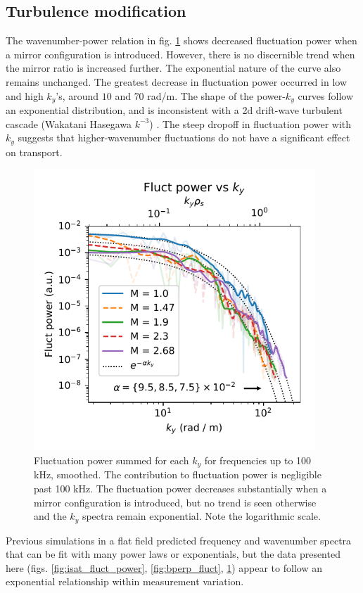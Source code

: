 \subsection{\label{sec:sub_turbulence}Turbulence modification}
 The wavenumber-power relation in fig. \ref{fig:fluct-power_ky} shows decreased fluctuation power when a mirror configuration is introduced. However, there is no discernible trend when the mirror ratio is increased further. The exponential nature of the curve also remains unchanged. The greatest decrease in fluctuation power occurred in low and high $k_y$'s, around $10$ and $70$ rad/m. The shape of the power-$k_y$ curves follow an exponential distribution, and is inconsistent with a 2d drift-wave turbulent cascade (Wakatani Hasegawa $k^{-3}$) \cite{Hasegawa-Wakatani}. The steep dropoff in fluctuation power with $k_y$ suggests that higher-wavenumber fluctuations do not have a significant effect on transport.
\begin{figure}
    \centering
    \includegraphics[width=300pt]{figures/fig12.pdf}
    \caption[Fluctuation power summed for each $k_y$]{Fluctuation power summed for each $k_y$ for frequencies up to 100 kHz, smoothed. The contribution to fluctuation power is negligible past 100 kHz. The fluctuation power decreases substantially when a mirror configuration is introduced, but no trend is seen otherwise and the $k_y$ spectra remain exponential. Note the logarithmic scale.}
    \label{fig:fluct-power_ky}
\end{figure}

Previous simulations in a flat field \cite{Friedman_simulation_2013} predicted frequency and wavenumber spectra that can be fit with many power laws or exponentials, but the data presented here (figs. \ref{fig:isat_fluct_power}, \ref{fig:bperp_fluct}, \ref{fig:fluct-power_ky}) appear to follow an exponential relationship within measurement variation.

